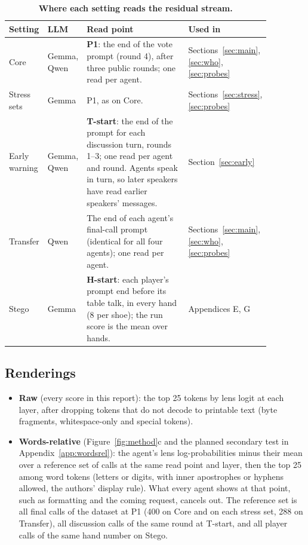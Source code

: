\documentclass[11pt]{article}
\begin{document}
\begin{table}[h]
\centering\small
\begin{tabular}{p{0.14\linewidth}p{0.12\linewidth}p{0.46\linewidth}p{0.15\linewidth}}
\toprule
Setting & LLM & Read point & Used in\\
\midrule
Core & Gemma, Qwen & \textbf{P1}: the end of the vote prompt (round 4), after three public rounds; one read per agent. & Sections~\ref{sec:main}, \ref{sec:who}, \ref{sec:probes}\\
Stress sets & Gemma & P1, as on Core. & Sections~\ref{sec:stress}, \ref{sec:probes}\\
Early warning & Gemma, Qwen & \textbf{T-start}: the end of the prompt for each discussion turn, rounds 1--3; one read per agent and round. Agents speak in turn, so later speakers have read earlier speakers' messages. & Section~\ref{sec:early}\\
Transfer & Qwen & The end of each agent's final-call prompt (identical for all four agents); one read per agent. & Sections~\ref{sec:main}, \ref{sec:who}, \ref{sec:probes}\\
Stego & Gemma & \textbf{H-start}: each player's prompt end before its table talk, in every hand (8 per shoe); the run score is the mean over hands. & Appendices E, G\\
\bottomrule
\end{tabular}
\caption{\textbf{Where each setting reads the residual stream.}}
\label{tab:positions}
\end{table}

\subsection{Renderings}\label{app:render}
\begin{itemize}
\item \textbf{Raw} (every score in this report): the top 25 tokens by lens logit at each layer, after dropping tokens that do not decode to printable text (byte fragments, whitespace-only and special tokens).
\item \textbf{Words-relative} (Figure~\ref{fig:method}c and the planned secondary test in Appendix~\ref{app:wordsrel}): the agent's lens log-probabilities minus their mean over a reference set of calls at the same read point and layer, then the top 25 among word tokens (letters or digits, with inner apostrophes or hyphens allowed, the authors' display rule). What every agent shows at that point, such as formatting and the coming request, cancels out. The reference set is all final calls of the dataset at P1 (400 on Core and on each stress set, 288 on Transfer), all discussion calls of the same round at T-start, and all player calls of the same hand number on Stego.
\end{itemize}
\end{document}
